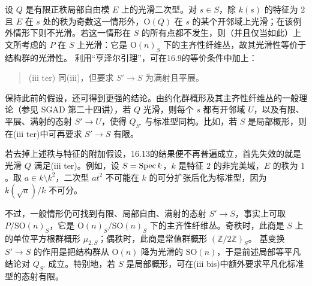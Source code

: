设 $Q$ 是有限正秩局部自由模 $E$ 上的光滑二次型。对 $s\in S$，除 $k(s)$ 的特征为 $2$ 且 $E$ 在 $s$ 处的秩为奇数这一情形外，$\mathrm O(Q)$ 在 $s$ 的某个开邻域上光滑；在该例外情形下则不光滑。若这一情形在 $S$ 的所有点都不发生，则（并且仅当如此）上文所考虑的 $P$ 在 $S$ 上光滑：它是 $\mathrm O(n)_S$ 下的主齐性纤维丛，故其光滑性等价于结构群的光滑性。
利用“亨泽尔引理”，可在16.9的等价条件中加上：
\begin{quote}
\textup{(iii ter)} 同(iii)，但要求 $S'\to S$ 为满射且平展。
\end{quote}

保持此前的假设，还可得到更强的结论。由约化群概形及其主齐性纤维丛的一般理论（参见 SGAD 第二十四讲），若 $Q$ 光滑，则每个 $s$ 都有开邻域 $U$，以及有限、平展、满射的态射 $S'\to U$，使得 $Q_{S'}$ 与标准型同构。比如，若 $S$ 是局部概形，则在(iii ter)中可再要求 $S'\to S$ 有限。

若去掉上述秩与特征的附加假设，16.13的结果便不再普遍成立，首先失效的就是光滑 $Q$ 满足(iii ter)。例如，设 $S=\operatorname{Spec} k$，$k$ 是特征 $2$ 的非完美域，$E$ 的秩为 $1$。取 $a\in k\setminus k^2$，二次型 $at^2$ 不可能在 $k$ 的可分扩张后化为标准型，因为 $k(\sqrt a)/k$ 不可分。

不过，一般情形仍可找到有限、局部自由、满射的态射 $S'\to S$，事实上可取 $P/\mathrm{SO}(n)_S$，它是 $\mathrm O(n)_S/\mathrm{SO}(n)_S$ 下的主齐性纤维丛。奇秩时，此商是 $S$ 上的单位平方根群概形 $\mu_{2,S}$；偶秩时，此商是常值群概形 $(\mathbb Z/2\mathbb Z)_S$。
基变换 $S'\to S$ 的作用是把结构群从 $\mathrm O(n)$ 降为光滑的 $\mathrm{SO}(n)$，于是前述局部等平凡结论对 $Q_{S'}$ 成立。特别地，若 $S$ 是局部概形，可在(iii bis)中额外要求平凡化标准型的态射有限。
\par\endgroup

